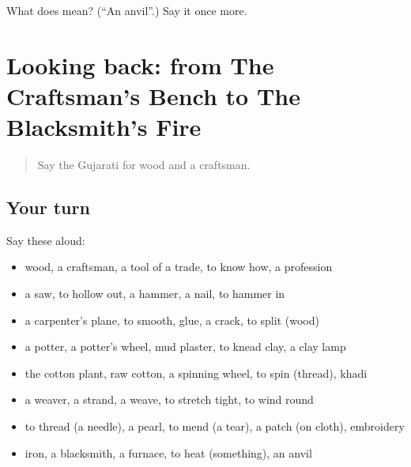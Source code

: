 \begin{tcolorbox}[breakable,colback=teal!4,colframe=teal!35!black,title={Before you move on}]
What does  mean? (\textquotedblleft{}An anvil\textquotedblright{}.) Say it once more.
\end{tcolorbox}
\section[(dialogue)]{Looking back: from The Craftsman's Bench to The Blacksmith's Fire}

\label{lesson:GU-R508-review-501-508}



\begin{quote}
Say the Gujarati for wood and a craftsman.
\end{quote}

\subsection*{Your turn}
Say these aloud:

\begin{itemize}
\raggedright
  \item wood, a craftsman, a tool of a trade, to know how, a profession
  \item a saw, to hollow out, a hammer, a nail, to hammer in
  \item a carpenter's plane, to smooth, glue, a crack, to split (wood)
  \item a potter, a potter's wheel, mud plaster, to knead clay, a clay lamp
  \item the cotton plant, raw cotton, a spinning wheel, to spin (thread), khadi
  \item a weaver, a strand, a weave, to stretch tight, to wind round
  \item to thread (a needle), a pearl, to mend (a tear), a patch (on cloth), embroidery
  \item iron, a blacksmith, a furnace, to heat (something), an anvil
\end{itemize}

